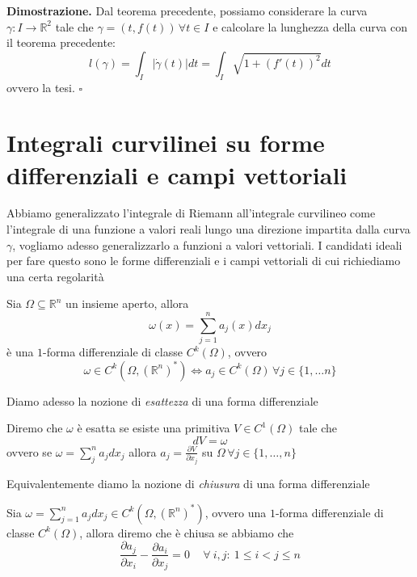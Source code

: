 \noindent \textbf{Dimostrazione. }
Dal teorema precedente, possiamo considerare la curva $\gamma: I \to \mathbb{R}^2$ tale che $\gamma = (t, f(t)) \, \forall t \in I$ e calcolare la lunghezza della curva con il teorema precedente:
$$
	\mathit{l}(\gamma) = \int_{I} |\dot{\gamma}(t)|dt = \int_I \sqrt{1 + (f'(t))^2} dt
$$
ovvero la tesi.
\hfill $\square$

\vspace{0.5cm}
\section{Integrali curvilinei su forme differenziali e campi vettoriali}

Abbiamo generalizzato l'integrale di Riemann all'integrale curvilineo come l'integrale di una funzione a valori reali lungo una direzione impartita dalla curva $\gamma$, vogliamo adesso generalizzarlo a funzioni a valori vettoriali. I candidati ideali per fare questo sono le forme differenziali e i campi vettoriali di cui richiediamo una certa regolarità

\vspace{0.5cm}
\begin{definition}[\textcolor{blue}{$1$-forma differenziale di classe $C^k$}]
Sia $\Omega \subseteq \mathbb{R}^n$ un insieme aperto, allora $$\omega(x) = \sum_{j=1}^n a_j(x)dx_j$$ è una $1$-forma differenziale di classe
$C^k(\Omega)$, ovvero
$$
\omega \in C^k(\Omega, (\mathbb{R}^n)^*) \iff a_j \in C^k(\Omega) \, \forall j \in \{1, \ldots n \}
$$
\end{definition}

Diamo adesso la nozione di \emph{esattezza} di una forma differenziale

\vspace{0.5cm}
\begin{definition}[\textcolor{blue}{esattezza di una $1$-forma differenziale}]
	Diremo che $\omega$ è esatta se esiste una primitiva $V \in C^1(\Omega)$ tale che
	$$
		dV = \omega
	$$
	ovvero se $\omega = \sum\limits_{j}^n a_j dx_j$ allora $a_j = \frac{\partial V}{\partial x_j}$ su $\Omega \, \forall j \in \{1, \ldots, n\}$
\end{definition}

Equivalentemente diamo la nozione di \emph{chiusura} di una forma differenziale

\vspace{0.5cm}
\begin{definition}
	Sia $\omega = \sum_{j=1}^n a_j dx_j \in C^k(\Omega, (\mathbb{R}^n)^*)$, ovvero una $1$-forma differenziale di classe $C^k(\Omega)$, allora diremo che
	è chiusa se abbiamo che
	$$
		\frac{\partial a_j}{\partial x_i} - \frac{\partial a_i}{\partial x_j} = 0 \, \quad\forall\ i, j:\ 1 \leq i < j \leq n
	$$
\end{definition}

